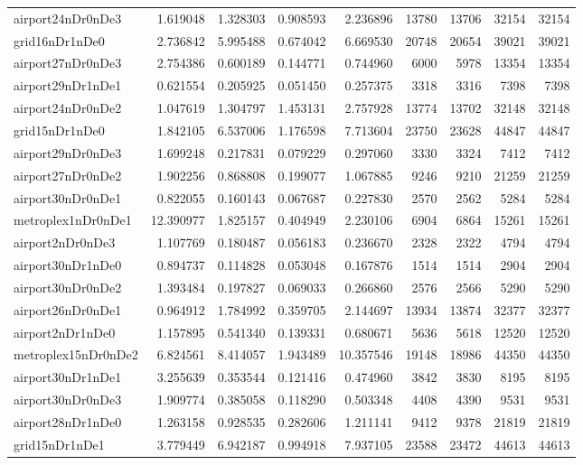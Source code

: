 \begin{longtable}{|l|r|r|r|r|r|r|r|r|}
airport24nDr0nDe3 & 1.619048 & 1.328303 & 0.908593 & 2.236896 & 13780 & 13706 & 32154 & 32154 \\
grid16nDr1nDe0 & 2.736842 & 5.995488 & 0.674042 & 6.669530 & 20748 & 20654 & 39021 & 39021 \\
airport27nDr0nDe3 & 2.754386 & 0.600189 & 0.144771 & 0.744960 & 6000 & 5978 & 13354 & 13354 \\
airport29nDr1nDe1 & 0.621554 & 0.205925 & 0.051450 & 0.257375 & 3318 & 3316 & 7398 & 7398 \\
airport24nDr0nDe2 & 1.047619 & 1.304797 & 1.453131 & 2.757928 & 13774 & 13702 & 32148 & 32148 \\
grid15nDr1nDe0 & 1.842105 & 6.537006 & 1.176598 & 7.713604 & 23750 & 23628 & 44847 & 44847 \\
airport29nDr0nDe3 & 1.699248 & 0.217831 & 0.079229 & 0.297060 & 3330 & 3324 & 7412 & 7412 \\
airport27nDr0nDe2 & 1.902256 & 0.868808 & 0.199077 & 1.067885 & 9246 & 9210 & 21259 & 21259 \\
airport30nDr0nDe1 & 0.822055 & 0.160143 & 0.067687 & 0.227830 & 2570 & 2562 & 5284 & 5284 \\
metroplex1nDr0nDe1 & 12.390977 & 1.825157 & 0.404949 & 2.230106 & 6904 & 6864 & 15261 & 15261 \\
airport2nDr0nDe3 & 1.107769 & 0.180487 & 0.056183 & 0.236670 & 2328 & 2322 & 4794 & 4794 \\
airport30nDr1nDe0 & 0.894737 & 0.114828 & 0.053048 & 0.167876 & 1514 & 1514 & 2904 & 2904 \\
airport30nDr0nDe2 & 1.393484 & 0.197827 & 0.069033 & 0.266860 & 2576 & 2566 & 5290 & 5290 \\
airport26nDr0nDe1 & 0.964912 & 1.784992 & 0.359705 & 2.144697 & 13934 & 13874 & 32377 & 32377 \\
airport2nDr1nDe0 & 1.157895 & 0.541340 & 0.139331 & 0.680671 & 5636 & 5618 & 12520 & 12520 \\
metroplex15nDr0nDe2 & 6.824561 & 8.414057 & 1.943489 & 10.357546 & 19148 & 18986 & 44350 & 44350 \\
airport30nDr1nDe1 & 3.255639 & 0.353544 & 0.121416 & 0.474960 & 3842 & 3830 & 8195 & 8195 \\
airport30nDr0nDe3 & 1.909774 & 0.385058 & 0.118290 & 0.503348 & 4408 & 4390 & 9531 & 9531 \\
airport28nDr1nDe0 & 1.263158 & 0.928535 & 0.282606 & 1.211141 & 9412 & 9378 & 21819 & 21819 \\
grid15nDr1nDe1 & 3.779449 & 6.942187 & 0.994918 & 7.937105 & 23588 & 23472 & 44613 & 44613 \\

\end{longtable}
